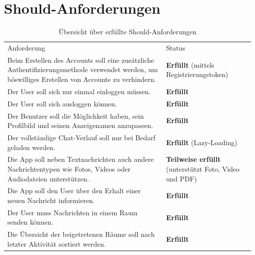     \newpage
    \section{Should-Anforderungen}\label{sec:should-anforderungen}
    \begin{table}[h]
        \centering
        \begin{tabular}{p{}|p{}}
            Anforderung & Status\\
            \cline{1-2}
            Beim Erstellen des Accounts soll eine zusätzliche Authentifizierungsmethode verwendet werden, um böswilliges Erstellen von Accounts zu verhindern.
            &  \textbf{Erfüllt} (mittels Registrierungstoken)\\
            \cline{1-2}
            Der User soll sich nur einmal einloggen müssen. &  \textbf{Erfüllt} \\
            \cline{1-2}
            Der User soll sich ausloggen können. & \textbf{Erfüllt}  \\
            \cline{1-2}
            Der Benutzer soll die Möglichkeit haben, sein Profilbild und seinen Anzeigenamen anzupassen. &  \textbf{Erfüllt} \\
            \cline{1-2}
            Der vollständige Chat-Verlauf soll nur bei Bedarf geladen werden. & \textbf{Erfüllt} (Lazy-Loading)\\
            \cline{1-2}
            Die App soll neben Textnachrichten auch andere Nachrichtentypen wie Fotos, Videos oder Audiodateien unterstützen. & \textbf{Teilweise erfüllt} (unterstützt Foto, Video und PDF) \\
            \cline{1-2}
            Die App soll den User über den Erhalt einer neuen Nachricht informieren. & \textbf{Erfüllt} \\
            \cline{1-2}
            Der User muss Nachrichten in einem Raum senden können. & \textbf{Erfüllt} \\
            \cline{1-2}
            Die Übersicht der beigetretenen Räume soll nach letzter Aktivität sortiert werden. & \textbf{Erfüllt}
        \end{tabular}
        \caption{Übersicht über erfüllte Should-Anforderungen}
        \label{tab:erfüllte-should-anforderungen}
    \end{table}

    \newpage
